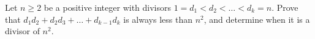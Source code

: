Let $n \ge 2$ be a positive integer
with divisors $1 = d_1 < d_2 < \dots < d_k = n$.
Prove that $d_1d_2 + d_2d_3 + \dots + d_{k-1} d_k$ is always less than $n^2$,
and determine when it is a divisor of $n^2$.